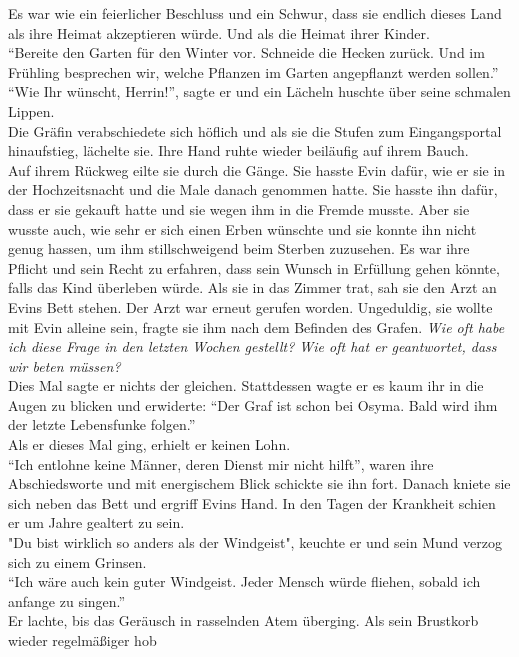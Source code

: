 Es war wie ein feierlicher Beschluss und ein Schwur, dass sie endlich dieses Land als ihre Heimat 
akzeptieren würde. Und als die Heimat ihrer Kinder.\\
``Bereite den Garten für den Winter vor. Schneide die Hecken zurück. Und im Frühling besprechen 
wir, welche Pflanzen im Garten angepflanzt werden sollen.''\\
``Wie Ihr wünscht, Herrin!'', sagte er und ein Lächeln huschte über seine schmalen Lippen.\\
Die Gräfin verabschiedete sich höflich und als sie die Stufen zum Eingangsportal hinaufstieg, 
lächelte sie. Ihre Hand ruhte wieder beiläufig auf ihrem Bauch. \\

Auf ihrem Rückweg eilte sie durch die Gänge. Sie hasste Evin dafür, wie er sie in der 
Hochzeitsnacht und die Male danach genommen hatte. Sie hasste ihn dafür, dass er sie gekauft hatte 
und sie wegen ihm in die Fremde musste. Aber sie wusste auch, wie sehr er sich einen Erben wünschte 
und sie konnte ihn nicht genug hassen, um ihm stillschweigend beim Sterben zuzusehen. Es war ihre 
Pflicht und sein Recht zu erfahren, dass sein Wunsch in Erfüllung gehen könnte, falls das Kind 
überleben würde. Als sie in das Zimmer trat, sah sie den Arzt an Evins Bett stehen. Der Arzt war 
erneut gerufen worden. Ungeduldig, sie wollte mit Evin alleine sein, fragte sie ihm nach dem 
Befinden des Grafen. \textit{Wie oft habe ich diese Frage in den letzten Wochen gestellt? Wie oft 
hat er geantwortet, dass wir beten müssen?}\\
Dies Mal sagte er nichts der gleichen. Stattdessen wagte er es kaum ihr in die Augen zu blicken und 
erwiderte: ``Der Graf ist schon bei Osyma. Bald wird ihm der letzte Lebensfunke folgen.''\\
Als er dieses Mal ging, erhielt er keinen Lohn.\\
``Ich entlohne keine Männer, deren Dienst mir nicht hilft'', waren ihre Abschiedsworte und mit 
energischem Blick schickte sie ihn fort. Danach kniete sie sich neben das Bett und ergriff Evins 
Hand. In den Tagen der Krankheit schien er um Jahre gealtert zu sein. \\
"Du bist wirklich so anders als der Windgeist", keuchte er und sein Mund verzog sich zu einem 
Grinsen.\\
``Ich wäre auch kein guter Windgeist. Jeder Mensch würde fliehen, sobald ich anfange zu singen.''\\
Er lachte, bis das Geräusch in rasselnden Atem überging. Als sein Brustkorb wieder regelmäßiger hob 
